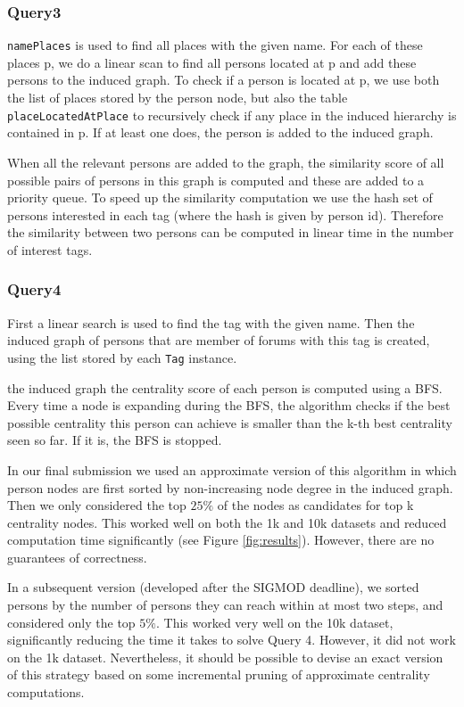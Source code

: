 \documentclass{article}
\begin{document}
\subsubsection{Query3} \texttt{namePlaces} is used to find all places with
the given name. For each of these places p, we do a linear scan to find 
all persons located at p and add these persons to the induced graph. 
To check if a person is located at p, we use both the 
list of places stored by the person node, but also the table 
\texttt{placeLocatedAtPlace} to recursively check if any place 
in the induced hierarchy is contained in p. If at least one does, 
the person is added to the induced graph.
              
When all the relevant persons are added to the graph, 
the similarity score of all possible pairs of persons in this
graph is computed and these are added to a priority queue. To speed up
the similarity computation we use the hash set of persons interested in
each tag (where the hash is given by person id). Therefore the similarity 
between two persons can be computed in linear time in the number of 
interest tags.
              
\subsubsection{Query4} First a linear search is used to find the tag with
the given name. Then the induced graph of persons that are member of
forums with this tag is created, using the list stored by each \texttt{Tag} instance.
               
the induced graph the centrality score of each person is computed
using a BFS. Every time a node is expanding during the BFS, the
algorithm checks if the best possible centrality this person can
achieve is smaller than the k-th best centrality seen so far. If it
is, the BFS is stopped. 

In our final submission we used an approximate version of this algorithm
in which person nodes are first sorted by non-increasing node degree in the 
induced graph. Then we only considered the top $25\%$ of the nodes as 
candidates for top k centrality nodes. This worked well on both the 1k and 10k
datasets and reduced computation time significantly (see Figure \ref{fig:results}).
However, there are no guarantees of correctness. 

In a subsequent version (developed after the SIGMOD deadline), 
we sorted persons by the number of persons they can reach within at most 
two steps, and considered only the top $5\%$. This worked very well on the 
10k dataset, significantly reducing the time it takes to solve Query 4. 
However, it did not work on the 1k dataset. Nevertheless, it 
should be possible to devise an exact version of this strategy based on some
incremental pruning of approximate centrality computations. 
\end{document}
